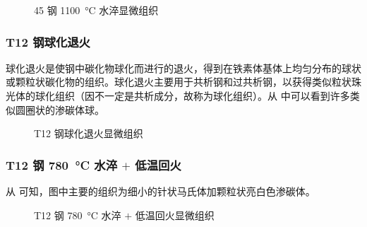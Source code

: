 \documentclass[a4paper,utf8]{article}
\begin{document}
    \begin{figure}[!ht]
        \hspace{20pt}
        \caption{45 钢 \SI{1100}{\degreeCelsius} 水淬显微组织\label{fig:n11}}
    \end{figure}

    \subsubsection{T12 钢球化退火}
    球化退火是使钢中碳化物球化而进行的退火，得到在铁素体基体上均匀分布的球状或颗粒状碳化物的组织。球化退火主要用于共析钢和过共析钢，以获得类似粒状珠光体的球化组织（因不一定是共析成分，故称为球化组织）。从 中可以看到许多类似圆圈状的渗碳体球。
    \begin{figure}[!ht]
        \hspace{20pt}
        \caption{T12 钢球化退火显微组织\label{fig:n12}}
    \end{figure}

    \subsubsection{T12 钢 \SI{780}{\degreeCelsius} 水淬 $+$ 低温回火\label{ss2:t12_780}}
    从 可知，图中主要的组织为细小的针状马氏体加颗粒状亮白色渗碳体。
    \begin{figure}[!ht]
        \hspace{20pt}
        \caption{T12 钢 \SI{780}{\degreeCelsius} 水淬 $+$ 低温回火显微组织\label{fig:n13}}
    \end{figure}
\end{document}
